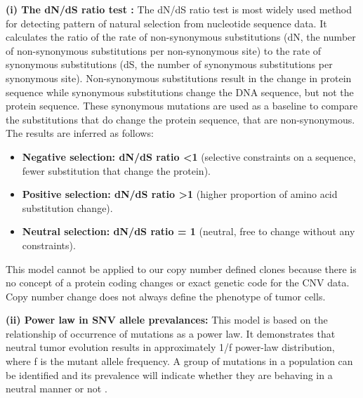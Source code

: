 \textbf{(i) The dN/dS ratio test \cite{martincorena2017universal}:} 
The dN/dS ratio test is most widely used method for detecting pattern of natural selection from nucleotide sequence data. It calculates the ratio of the rate of non-synonymous substitutions (dN, the number of non-synonymous substitutions per non-synonymous site) to the rate of synonymous substitutions (dS, the number of synonymous substitutions per synonymous site). Non-synonymous substitutions result in the change in protein sequence while synonymous substitutions change the DNA sequence, but not the protein sequence. These synonymous mutations are used as a baseline to compare the substitutions that do change the protein sequence, that are non-synonymous. The results are inferred as follows:
\begin{itemize}
     \item \textbf{Negative selection: dN/dS ratio <1} (selective constraints on a sequence, fewer substitution that change the protein). 
 \item \textbf{Positive selection: dN/dS ratio >1} (higher proportion of amino acid substitution change).
\item \textbf{Neutral selection: dN/dS ratio = 1} (neutral, free to change without any constraints).
\end{itemize}
This model cannot be applied to our copy number defined clones because there is no concept of a protein coding changes or exact genetic code for the CNV data. Copy number change does not always define the phenotype of tumor cells.




\textbf{(ii) Power law in SNV allele prevalances:} This model is based on the relationship of occurrence of mutations as a power law. It demonstrates that neutral tumor evolution results in approximately 1/f power-law distribution, where f is the mutant allele frequency.
A group of mutations in a population can be identified and its prevalence will indicate whether they are behaving in a neutral manner or not \cite{williams2016identification}.

